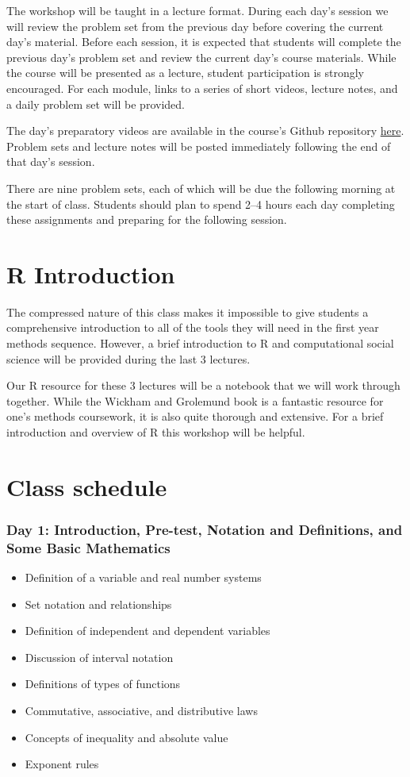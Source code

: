 \documentclass[12pt]{article}
\begin{document}
The workshop will be taught in a lecture format. During each day's session we
will review the problem set from the previous day before covering the current
day's material. Before each session, it is expected that students will complete
the previous day's problem set and review the current day's course
materials. While the course will be presented as a lecture, student
participation is strongly encouraged. For each module, links to a series of
short videos, lecture notes, and a daily problem set will be provided.

The day's preparatory videos are available in the course's Github repository
\href{https://github.com/benjamin-w-campbell/math-workshop}{here}. Problem sets and
lecture notes will be posted immediately following the end of that day's
session.

There are nine problem sets, each of which will be due the following morning at
the start of class. Students should plan to spend 2--4 hours each day completing
these assignments and preparing for the following session.


\section*{R Introduction}

The compressed nature of this class makes it impossible to give students a
comprehensive introduction to all of the tools they will need in the first year
methods sequence. However, a brief introduction to R and computational social
science will be provided during the last 3 lectures.

Our R resource for these 3 lectures will be a notebook that we will work through together.
While the Wickham and Grolemund book is a fantastic resource for one's methods coursework,
it is also quite thorough and extensive. For a brief introduction and overview
of R this workshop will be helpful.


\newpage
\section*{Class schedule}

\subsubsection*{Day 1: Introduction, Pre-test, Notation and Definitions, and
Some Basic Mathematics}

\begin{itemize} \itemsep-0.35em
\item Definition of a variable and real number systems
\item Set notation and relationships
\item Definition of independent and dependent variables
\item Discussion of interval notation
\item Definitions of types of functions
\item Commutative, associative, and distributive laws
\item Concepts of inequality and absolute value
\item Exponent rules
\end{itemize}
\end{document}
